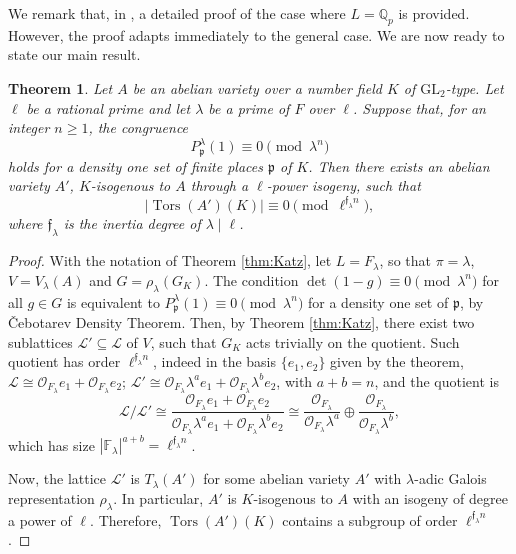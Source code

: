\documentclass[a4paper,11pt]{amsart}
\newtheorem{theorem}{Theorem}[section]
\theoremstyle{definition}
\newcommand{\Q}{\mathbb Q}
\newcommand{\p}{\mathfrak{p}}
\newcommand{\f}{\mathfrak{f}}
\newcommand{\GL}{\text{GL}}
\DeclareMathOperator{\Tors}{Tors}
\begin{document}
We remark that, in \cite{Katz1981GaloisVarieties}, a detailed proof of the case where \(L=\Q_p\) is provided. However, the proof adapts immediately to the general case. We are now ready to state our main result.

\begin{theorem}\label{thm:main_new}
    Let \(A\) be an abelian variety over a number field \(K\) of \(\GL_2\)-type. Let \(\ell\) be a rational prime and let \(\lambda\) be a prime of \(F\) over \(\ell\). Suppose that, for an integer \(n \ge 1\), the congruence
    \[
    P_\p^\lambda(1) \equiv 0 \pmod {\lambda^n}
    \]
    holds for a density one set of finite places \(\p\) of \(K\). Then there exists an abelian variety \(A'\), \(K\)-isogenous to \(A\) through a \(\ell\)-power isogeny, such that 
    \[
    |\Tors(A')(K)| \equiv 0 \pmod {\ell^{\f_{\lambda}n}},
    \]
    where \(\f_\lambda\) is the inertia degree of \(\lambda \mid \ell\).
\end{theorem}
\begin{proof}
    With the notation of Theorem \ref{thm:Katz}, let \(L=F_\lambda\), so that \(\pi=\lambda\), \(V=V_\lambda (A)\) and \(G=\rho_\lambda(G_K)\). The condition \(\det(1-g)\equiv 0 \pmod {\lambda^n}\) for all \(g \in G\) is equivalent to \(P_\p^{\lambda}(1) \equiv 0 \pmod{\lambda^n}\) for a density one set of \(\p\), by \v Cebotarev Density Theorem. Then, by Theorem \ref{thm:Katz}, there exist two sublattices \(\mathcal{L'} \subseteq \mathcal{L}\) of \(V\), such that \(G_K\) acts trivially on the quotient. Such quotient has order \(\ell^{\f_\lambda n}\), indeed in the basis \(\{e_1,e_2\}\) given by the theorem, \(\mathcal{L} \cong \mathcal{O}_{F_\lambda} e_1 + \mathcal{O}_{F_\lambda} e_2\); \(\mathcal{L}' \cong \mathcal{O}_{F_\lambda} \lambda^a e_1 + \mathcal{O}_{F_\lambda} \lambda^b e_2\), with \(a+b=n\), and the quotient is
    \[
    \mathcal{L}/\mathcal{L}' \cong \dfrac{\mathcal{O}_{F_\lambda} e_1 + \mathcal{O}_{F_\lambda} e_2}{\mathcal{O}_{F_\lambda} \lambda^a e_1 + \mathcal{O}_{F_\lambda} \lambda^b e_2} \cong \dfrac{{\mathcal{O}_{F_\lambda}}}{\mathcal{O}_{F_\lambda} \lambda^a} \oplus \dfrac{\mathcal{O}_{F_\lambda}}{\mathcal{O}_{F_\lambda} \lambda^b},
    \]
    which has size \(|\mathbb{F}_\lambda|^{a+b} = \ell^{\f_\lambda n}\).

    Now, the lattice \(\mathcal{L}'\) is \(T_\lambda (A')\) for some abelian variety \(A'\) with \(\lambda\)-adic Galois representation \(\rho_\lambda\). In particular, \(A'\) is \(K\)-isogenous to \(A\) with an isogeny of degree a power of \(\ell\). Therefore, \(\Tors (A')(K)\) contains a subgroup of order \(\ell^{\f_\lambda n}\).
\end{proof}
\end{document}
